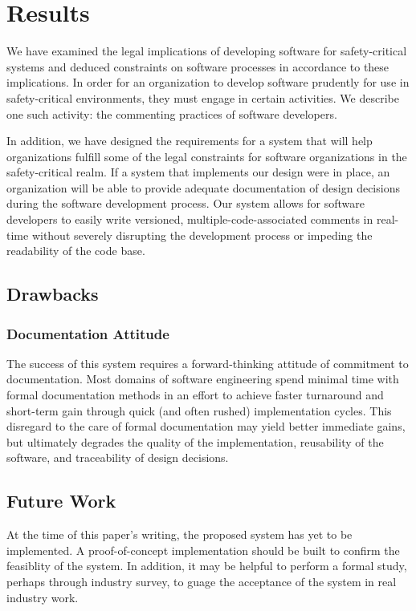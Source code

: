 \section{Results}\label{results}
We have examined the legal implications of developing software for
safety-critical systems and deduced constraints on software processes in
accordance to these implications. In order for an organization to develop 
software prudently for use in safety-critical environments, they must engage in
certain activities. We describe one such activity: the commenting practices of
software developers.

In addition, we have designed the requirements for a system that will help
organizations fulfill some of the legal constraints for software organizations
in the safety-critical realm. If a system that implements our design were in
place, an organization will be able to provide adequate documentation of design
decisions during the software development process. Our system allows for 
software developers to easily write versioned, multiple-code-associated comments
in real-time without severely disrupting the  development process or impeding
the readability of the code base.

\subsection{Drawbacks}

\subsubsection*{Documentation Attitude}
The success of this system requires a forward-thinking attitude of commitment to
documentation. Most domains of software engineering spend minimal time with
formal documentation methods in an effort to achieve faster turnaround and
short-term gain through quick (and often rushed) implementation cycles. This
disregard to the care of formal documentation may yield better immediate gains,
but ultimately degrades the quality of the implementation, reusability of the
software,  and traceability of design decisions.

\subsection{Future Work}
At the time of this paper's writing, the proposed system has yet to be
implemented. A proof-of-concept implementation should be built to confirm the
feasiblity of the system. In addition, it may be helpful to perform a formal
study, perhaps through industry survey, to guage the acceptance of the system in
real industry work.

